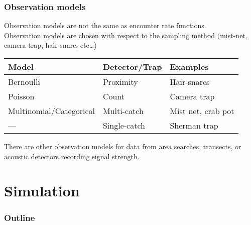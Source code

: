 \documentclass[color=usenames,dvipsnames]{beamer}\usepackage[]{graphicx}\usepackage[]{color}
\begin{document}
\begin{frame}
  \frametitle{Observation models}
  Observation models are not the same as encounter rate functions. \\
  \pause \vfill
  Observation models are chosen with respect to the sampling
      method (mist-net, camera trap, hair snare, etc\dots) \\
  \pause \vfill
  \centering
    \begin{tabular}{lll}
      \hline
      Model       & Detector/Trap     & Examples           \\
      \hline
      Bernoulli   & Proximity    & Hair-snares        \\
      Poisson     & Count        & Camera trap        \\
      Multinomial/Categorical & Multi-catch  & Mist net, crab pot \\
      ---          & Single-catch & Sherman trap       \\
      \hline
    \end{tabular}
    \pause \vfill
There are other observation models for data from area searches,
transects, or acoustic detectors recording signal strength.
\end{frame}





\section{Simulation}


\begin{frame}
  \frametitle{Outline}
  \Large
  \tableofcontents[currentsection]
\end{frame}




\end{document}
